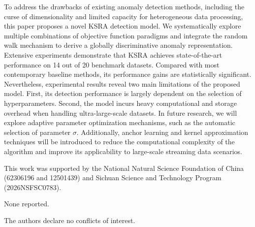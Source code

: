 \documentclass[ASNA,twocolumn]{USG} %
\begin{document}
To address the drawbacks of existing anomaly detection methods, including the curse of dimensionality and limited capacity for heterogeneous data processing, this paper proposes a novel KSRA detection model. We systematically explore multiple combinations of objective function paradigms and integrate the random walk mechanism to derive a globally discriminative anomaly representation. Extensive experiments demonstrate that KSRA achieves state-of-the-art performance on 14 out of 20 benchmark datasets. Compared with most contemporary baseline methods, its performance gains are statistically significant. Nevertheless, experimental results reveal two main limitations of the proposed model. First, its detection performance is largely dependent on the selection of hyperparameters. Second, the model incurs heavy computational and storage overhead when handling ultra-large-scale datasets. In future research, we will explore adaptive parameter optimization mechanisms, such as the automatic selection of parameter $\sigma$. Additionally, anchor learning and kernel approximation techniques will be introduced to reduce the computational complexity of the algorithm and improve its applicability to large-scale streaming data scenarios.



This work was supported by the National Natural Science Foundation of China (62306196 and 12501439) and Sichuan Science and Technology Program (2026NSFSC0783).


None reported.


The authors declare no conflicts of interest.


\end{document}
